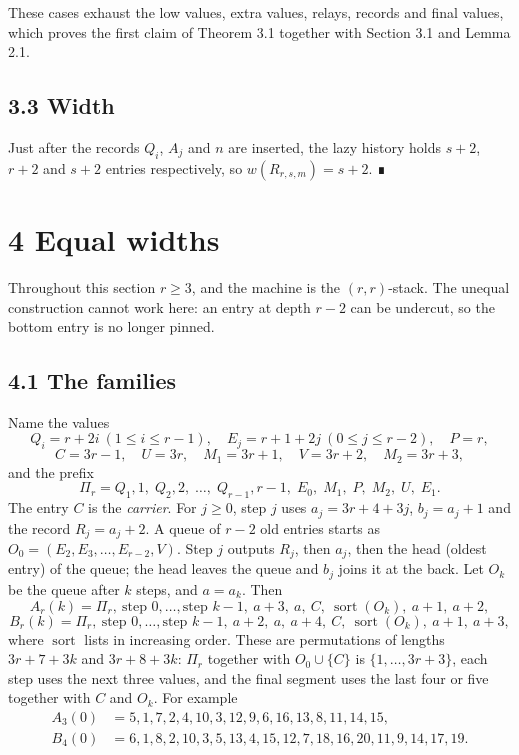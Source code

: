 \documentclass[11pt,letterpaper]{article}
\begin{document}
These cases exhaust the low values, extra values, relays, records and
final values, which proves the first claim of Theorem 3.1 together with
Section 3.1 and Lemma 2.1.

\subsection{3.3 Width}\label{width}

Just after the records \(Q_i\), \(A_j\) and \(n\) are inserted, the lazy
history holds \(s+2\), \(r+2\) and \(s+2\) entries respectively, so
\(w(R_{r,s,m})=s+2\). ∎

\section{4 Equal widths}\label{equal-widths}

Throughout this section \(r\ge3\), and the machine is the
\((r,r)\)-stack. The unequal construction cannot work here: an entry at
depth \(r-2\) can be undercut, so the bottom entry is no longer pinned.

\subsection{4.1 The families}\label{the-families}

Name the values
\[Q_i=r+2i\ (1\le i\le r-1),\quad E_j=r+1+2j\ (0\le j\le r-2),\quad P=r,\]
\[C=3r-1,\quad U=3r,\quad M_1=3r+1,\quad V=3r+2,\quad M_2=3r+3,\] and
the prefix
\[\Pi_r=Q_1,1,\;Q_2,2,\;\dots,\;Q_{r-1},r-1,\;E_0,\;M_1,\;P,\;M_2,\;U,\;E_1.\]
The entry \(C\) is the \emph{carrier}. For \(j\ge0\), step \(j\) uses
\(a_j=3r+4+3j\), \(b_j=a_j+1\) and the record \(R_j=a_j+2\). A queue of
\(r-2\) old entries starts as \(O_0=(E_2,E_3,\dots,E_{r-2},V)\). Step
\(j\) outputs \(R_j\), then \(a_j\), then the head (oldest entry) of the
queue; the head leaves the queue and \(b_j\) joins it at the back. Let
\(O_k\) be the queue after \(k\) steps, and \(a=a_k\). Then
\[A_r(k)=\Pi_r,\ \text{step }0,\dots,\text{step }k-1,\ a+3,\ a,\ C,\ \operatorname{sort}(O_k),\ a+1,\ a+2,\]
\[B_r(k)=\Pi_r,\ \text{step }0,\dots,\text{step }k-1,\ a+2,\ a,\ a+4,\ C,\ \operatorname{sort}(O_k),\ a+1,\ a+3,\]
where \(\operatorname{sort}\) lists in increasing order. These are
permutations of lengths \(3r+7+3k\) and \(3r+8+3k\): \(\Pi_r\) together
with \(O_0\cup\{C\}\) is \(\{1,\dots,3r+3\}\), each step uses the next
three values, and the final segment uses the last four or five together
with \(C\) and \(O_k\). For example
\[\begin{aligned}A_3(0)&=5,1,7,2,4,10,3,12,9,6,16,13,8,11,14,15,\\B_4(0)&=6,1,8,2,10,3,5,13,4,15,12,7,18,16,20,11,9,14,17,19.\end{aligned}\]
\end{document}
